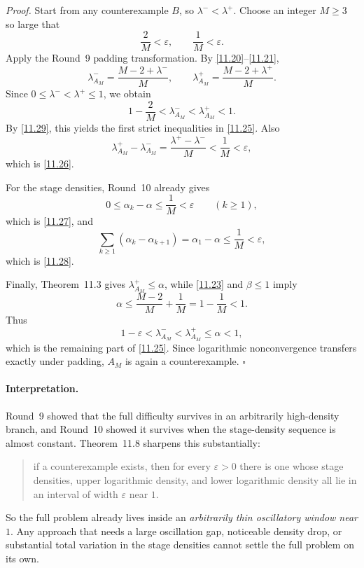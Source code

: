 \emph{Proof.}
Start from any counterexample $B$, so $\lambda^-<\lambda^+$.  Choose an integer $M\ge 3$ so large that
\begin{equation}
\frac{2}{M}<\varepsilon,
\qquad
\frac{1}{M}<\varepsilon.
\tag{11.29}
\end{equation}
Apply the Round~9 padding transformation.  By \eqref{11.20}--\eqref{11.21},
\[
\lambda^-_{A_M}=\frac{M-2+\lambda^-}{M},
\qquad
\lambda^+_{A_M}=\frac{M-2+\lambda^+}{M}.
\]
Since $0\le \lambda^-<\lambda^+\le 1$, we obtain
\[
1-\frac{2}{M}<\lambda^-_{A_M}<\lambda^+_{A_M}<1.
\]
By \eqref{11.29}, this yields the first strict inequalities in \eqref{11.25}.  Also
\[
\lambda^+_{A_M}-\lambda^-_{A_M}=\frac{\lambda^+-\lambda^-}{M}<\frac1M<\varepsilon,
\]
which is \eqref{11.26}.

For the stage densities, Round~10 already gives
\[
0\le \alpha_k-\alpha\le \frac1M<\varepsilon
\qquad (k\ge 1),
\]
which is \eqref{11.27}, and
\[
\sum_{k\ge 1}(\alpha_k-\alpha_{k+1})=\alpha_1-\alpha\le \frac1M<\varepsilon,
\]
which is \eqref{11.28}.

Finally, Theorem~11.3 gives $\lambda^+_{A_M}\le \alpha$, while \eqref{11.23} and $\beta\le 1$ imply
\[
\alpha\le \frac{M-2}{M}+\frac1M=1-\frac1M<1.
\]
Thus
\[
1-\varepsilon<\lambda^-_{A_M}<\lambda^+_{A_M}\le \alpha<1,
\]
which is the remaining part of \eqref{11.25}.  Since logarithmic nonconvergence transfers exactly under padding, $A_M$ is again a counterexample. \hfill $\square$

\paragraph{Interpretation.}
Round~9 showed that the full difficulty survives in an arbitrarily high-density branch, and Round~10 showed it survives when the stage-density sequence is almost constant.  Theorem~11.8 sharpens this substantially:
\begin{quote}
if a counterexample exists, then for every $\varepsilon>0$ there is one whose stage densities, upper logarithmic density, and lower logarithmic density all lie in an interval of width $\varepsilon$ near $1$.
\end{quote}
So the full problem already lives inside an \emph{arbitrarily thin oscillatory window near $1$}.  Any approach that needs a large oscillation gap, noticeable density drop, or substantial total variation in the stage densities cannot settle the full problem on its own.

